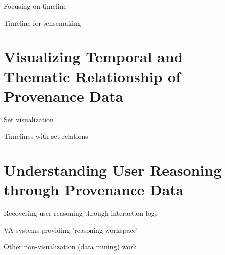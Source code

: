 Focusing on timeline

Timeline for sensemaking

\section{Visualizing Temporal and Thematic Relationship of Provenance Data}
Set visualization

Timelines with set relations

\section{Understanding User Reasoning through Provenance Data} 
Recovering user reasoning through interaction logs

VA systems providing 'reasoning workspace'

Other non-visualization (data mining) work